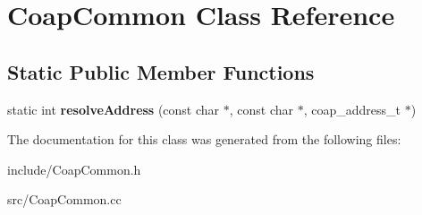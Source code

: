 \hypertarget{classCoapCommon}{}\section{Coap\+Common Class Reference}
\label{classCoapCommon}
\subsection*{Static Public Member Functions}
\begin{DoxyCompactItemize}
\item 
\mbox{\label{classCoapCommon_a3a2b20fe477be1c328f3ad0bc98f28dd}} 
static int {\bfseries resolve\+Address} (const char $\ast$, const char $\ast$, coap\+\_\+address\+\_\+t $\ast$)
\end{DoxyCompactItemize}


The documentation for this class was generated from the following files\+:\begin{DoxyCompactItemize}
\item 
include/Coap\+Common.\+h\item 
src/Coap\+Common.\+cc\end{DoxyCompactItemize}
